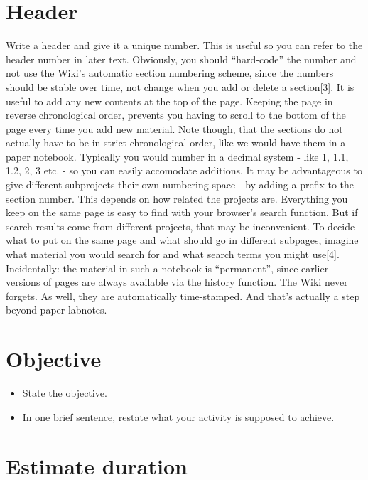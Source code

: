 \documentclass[]{book}
\providecommand{\tightlist}{%
  \setlength{\itemsep}{0pt}\setlength{\parskip}{0pt}}
\begin{document}
\section{Header}\label{header}

Write a header and give it a unique number. This is useful so you can
refer to the header number in later text. Obviously, you should
``hard-code'' the number and not use the Wiki's automatic section
numbering scheme, since the numbers should be stable over time, not
change when you add or delete a section{[}3{]}. It is useful to add any
new contents at the top of the page. Keeping the page in reverse
chronological order, prevents you having to scroll to the bottom of the
page every time you add new material. Note though, that the sections do
not actually have to be in strict chronological order, like we would
have them in a paper notebook. Typically you would number in a decimal
system - like 1, 1.1, 1.2, 2, 3 etc. - so you can easily accomodate
additions. It may be advantageous to give different subprojects their
own numbering space - by adding a prefix to the section number. This
depends on how related the projects are. Everything you keep on the same
page is easy to find with your browser's search function. But if search
results come from different projects, that may be inconvenient. To
decide what to put on the same page and what should go in different
subpages, imagine what material you would search for and what search
terms you might use{[}4{]}. Incidentally: the material in such a
notebook is ``permanent'', since earlier versions of pages are always
available via the history function. The Wiki never forgets. As well,
they are automatically time-stamped. And that's actually a step beyond
paper labnotes.

\section{Objective}\label{objective}

\begin{itemize}
\tightlist
\item
  State the objective.
\item
  In one brief sentence, restate what your activity is supposed to
  achieve.
\end{itemize}

\section{Estimate duration}\label{estimate-duration}
\end{document}
